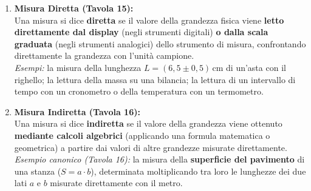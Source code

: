 \documentclass[11pt,a4paper,oneside]{report}
\begin{document}
\begin{definizione}
\begin{enumerate}[leftmargin=2em]
    \item \textbf{Misura Diretta (Tavola 15):}\\
    Una misura si dice \textbf{diretta} se il valore della grandezza fisica viene \textbf{letto direttamente dal display} (negli strumenti digitali) \textbf{o dalla scala graduata} (negli strumenti analogici) dello strumento di misura, confrontando direttamente la grandezza con l'unit\`a campione.\\
    \textit{Esempi:} la misura della lunghezza $L = (6{,}5 \pm 0{,}5)\,\mathrm{cm}$ di un'asta con il righello; la lettura della massa su una bilancia; la lettura di un intervallo di tempo con un cronometro o della temperatura con un termometro.

    \item \textbf{Misura Indiretta (Tavola 16):}\\
    Una misura si dice \textbf{indiretta} se il valore della grandezza viene ottenuto \textbf{mediante calcoli algebrici} (applicando una formula matematica o geometrica) a partire dai valori di altre grandezze misurate direttamente.\\
    \textit{Esempio canonico (Tavola 16):} la misura della \textbf{superficie del pavimento} di una stanza ($S = a \cdot b$), determinata moltiplicando tra loro le lunghezze dei due lati $a$ e $b$ misurate direttamente con il metro.
\end{enumerate}
\end{definizione}
\end{document}
